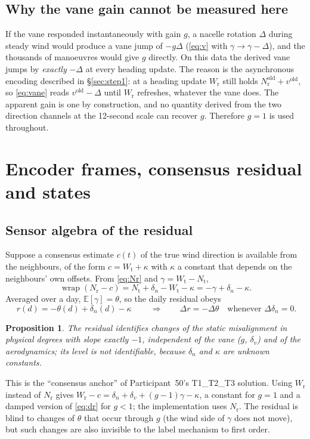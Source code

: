 \documentclass[11pt,a4paper]{article}
\newtheorem{proposition}{Proposition}
\theoremstyle{remark}
\newcommand{\wrap}{\operatorname{wrap}}
\newcommand{\E}{\mathbb{E}}
\newcommand{\Wt}{W_{\mathrm{t}}}
\newcommand{\Nt}{N_{\mathrm{t}}}
\newcommand{\Wr}{W_{\mathrm{r}}}
\newcommand{\Nr}{N_{\mathrm{r}}}
\begin{document}
\subsection{Why the vane gain cannot be measured here}\label{sec:gain}
If the vane responded instantaneously with gain $g$, a nacelle rotation $\Delta$
during steady wind would produce a vane jump of $-g\Delta$ (\eqref{eq:v} with
$\gamma\to\gamma-\Delta$), and the thousands of manoeuvres would give $g$
directly. On this data
the derived vane jumps by \emph{exactly} $-\Delta$ at every heading update. The
reason is the asynchronous encoding described in \S\ref{sec:step1}: at a
heading update $\Wr$ still holds $\Nr^{\mathrm{old}}+v^{\mathrm{old}}$, so
\eqref{eq:vane} reads $v^{\mathrm{old}}-\Delta$ until $\Wr$ refreshes, whatever
the vane does. The apparent gain is one by construction, and no quantity derived
from the two direction channels at the 12-second scale can recover $g$. Therefore
$g=1$ is used throughout.

\section{Encoder frames, consensus residual and states}\label{sec:step2}
\subsection{Sensor algebra of the residual}\label{sec:algebra}
Suppose a consensus estimate $c(t)$ of the true wind direction is available from
the neighbours, of the form $c = \Wt + \kappa$ with $\kappa$ a constant that
depends on the neighbours' own offsets. From \eqref{eq:Nr} and
$\gamma=\Wt-\Nt$,
\begin{equation}
  \wrap(\Nr - c) = \Nt + \delta_n - \Wt - \kappa = -\gamma + \delta_n - \kappa .
  \label{eq:residual}
\end{equation}
Averaged over a day, $\E[\gamma]=\theta$, so the daily residual obeys
\begin{equation}
  \boxed{\ r(d) = -\theta(d) + \delta_n(d) - \kappa\ }
  \qquad\Longrightarrow\qquad
  \Delta r = -\Delta\theta \quad\text{whenever } \Delta\delta_n = 0 .
  \label{eq:dr}
\end{equation}
\begin{proposition}\label{prop:residual}
The residual identifies \emph{changes} of the static misalignment in physical
degrees with slope exactly $-1$, independent of the vane ($g$, $\delta_v$) and
of the aerodynamics; its \emph{level} is not identifiable, because $\delta_n$
and $\kappa$ are unknown constants.
\end{proposition}
\noindent This is the ``consensus anchor'' of Participant~50's T1\_T2\_T3 solution. Using $\Wr$
instead of $\Nr$ gives $\Wr - c = \delta_n + \delta_v + (g-1)\gamma - \kappa$,
a constant for $g=1$ and a damped version of \eqref{eq:dr} for $g<1$; the
implementation uses $\Nr$. The residual is blind to changes of $\theta$ that
occur through $g$ (the wind side of $\gamma$ does not move), but such changes
are also invisible to the label mechanism to first order.
\end{document}
